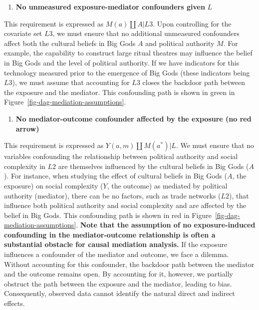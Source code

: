 \documentclass[
  singlecolumn]{article}
\providecommand{\tightlist}{%
  \setlength{\itemsep}{0pt}\setlength{\parskip}{0pt}}\usepackage{longtable,booktabs,array}
\begin{document}
\begin{enumerate}
\def\labelenumi{\arabic{enumi}.}
\setcounter{enumi}{2}
\tightlist
\item
  \textbf{No unmeasured exposure-mediator confounders given} \(L\)
\end{enumerate}

This requirement is expressed as \(M(a) \coprod A | L3\). Upon
controlling for the covariate set \(L3\), we must ensure that no
additional unmeasured confounders affect both the cultural beliefs in
Big Gods \(A\) and political authority \(M\). For example, the
capability to construct large ritual theatres may influence the belief
in Big Gods and the level of political authority. If we have indicators
for this technology measured prior to the emergence of Big Gods (these
indicators being \(L3\)), we must assume that accounting for \(L3\)
closes the backdoor path between the exposure and the mediator. This
confounding path is shown in green in
Figure~\ref{fig-dag-mediation-assumptions}.

\begin{enumerate}
\def\labelenumi{\arabic{enumi}.}
\setcounter{enumi}{3}
\tightlist
\item
  \textbf{No mediator-outcome confounder affected by the exposure (no
  red arrow)}
\end{enumerate}

This requirement is expressed as \(Y(a,m) \coprod M(a^*) | L\). We must
ensure that no variables confounding the relationship between political
authority and social complexity in \(L2\) are themselves influenced by
the cultural beliefs in Big Gods (\(A\)). For instance, when studying
the effect of cultural beliefs in Big Gods (\(A\), the exposure) on
social complexity (\(Y\), the outcome) as mediated by political
authority (mediator), there can be no factors, such as trade networks
(\(L2\)), that influence both political authority and social complexity
and are affected by the belief in Big Gods. This confounding path is
shown in red in Figure~\ref{fig-dag-mediation-assumptions}. \textbf{Note
that the assumption of no exposure-induced confounding in the
mediator-outcome relationship is often a substantial obstacle for causal
mediation analysis.} If the exposure influences a confounder of the
mediator and outcome, we face a dilemma. Without accounting for this
confounder, the backdoor path between the mediator and the outcome
remains open. By accounting for it, however, we partially obstruct the
path between the exposure and the mediator, leading to bias.
Consequently, observed data cannot identify the natural direct and
indirect effects.
\end{document}

